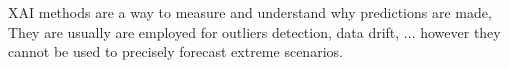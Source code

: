 
XAI methods are a way to measure and understand why predictions are made, They are usually are employed for outliers detection, data drift, ...  however they cannot be used to precisely forecast extreme scenarios. 


